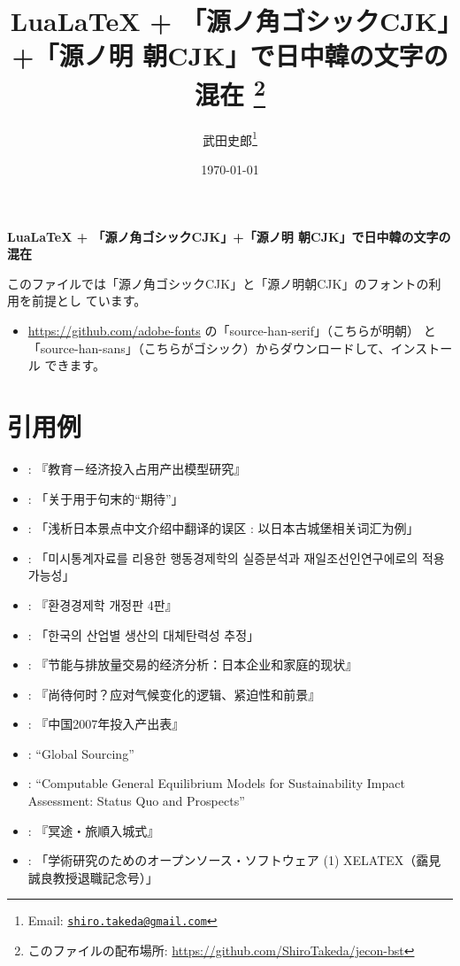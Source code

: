 \documentclass[article]{jlreq}
\title{\textbf{LuaLaTeX + 「源ノ角ゴシックCJK」+「源ノ明
 朝CJK」で日中韓の文字の混在}
\thanks{このファイルの配布場所: \url{https://github.com/ShiroTakeda/jecon-bst}}
}
\author{武田史郎\thanks{Email:
\texttt{\href{mailto:shiro.takeda@gmail.com}{shiro.takeda@gmail.com}}}}
\date{\today}
\begin{document}

\begin{flushleft}
{\Large \textbf{LuaLaTeX + 「源ノ角ゴシックCJK」+「源ノ明
 朝CJK」で日中韓の文字の混在}} 
\end{flushleft}

\vspace*{1em}

このファイルでは「源ノ角ゴシックCJK」と「源ノ明朝CJK」のフォントの利用を前提とし
ています。
\begin{itemize}
 \item \url{https://github.com/adobe-fonts} の「source-han-serif」（こちらが明朝）
       と「source-han-sans」（こちらがゴシック）からダウンロードして、インストール
       できます。
\end{itemize}

\section{引用例}
\begin{itemize}
 \item \citet{zhang_IO_2009}: 『教育－经济投入占用产出模型研究』
 \item \citet{40022221997}: 「关于用于句末的``期待''」
 \item \citet{40022198771}: 「浅析日本景点中文介绍中翻译的误区 : 以日本古城堡相关词汇为例」
 \item \citet{40022308104}: 「미시통계자료를 리용한 행동경제학의 실증분석과 재일조선인연구에로의 적용가능성」
 \item \citet{gwon-osang-env-econ-2020}: 『환경경제학 개정판 4판』
 \item \citet{Seong-Tae_Kim_2011}: 「한국의 산업별 생산의 대체탄력성 추정」
 \item \citet{arimura-takeda-energy-2017}: 『节能与排放量交易的经济分析：日本企业和家庭的现状』
 \item \citet{Stern_2016:chn}: 『尚待何时？应对气候变化的逻辑、紧迫性和前景』
 \item \citet{china-io-2007}: 『中国2007年投入产出表』
 \item \citet{Stokey2004}: ``Global Sourcing''
 \item \citet{Bohringer2006}: ``Computable General Equilibrium Models for
       Sustainability Impact Assessment: Status Quo and Prospects''
 \item \citet{内田90}: 『冥途・旅順入城式』
 \item \citet{120005614155}: 「学術研究のためのオープンソース・ソフトウェア (1)
       XELATEX（靎見誠良教授退職記念号）」
\end{itemize}
\end{document}
